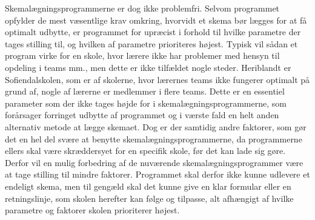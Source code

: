 Skemalægningsprogrammerne er dog ikke problemfri. Selvom programmet opfylder de mest væsentlige krav omkring, hvorvidt et skema bør lægges for at få optimalt udbytte, er programmet for upræcist i forhold til hvilke parametre der tages stilling til, og hvilken af parametre prioriteres højest. Typisk vil sådan et program virke for en skole, hvor lærere ikke har problemer med hensyn til opdeling i teams mm., men dette er ikke tilfældet nogle steder. Heriblandt er Sofiendalskolen, som er af skolerne, hvor lærernes teams ikke fungerer optimalt på grund af, nogle af lærerne er medlemmer i flere teams. Dette er en essentiel parameter som der ikke tages højde for i skemalægningsprogrammerne, som forårsager forringet udbytte af programmet og i værste fald en helt anden alternativ metode at lægge skemaet. Dog er der samtidig andre faktorer, som gør det en hel del svære at benytte skemalægningsprogrammerne, da programmerne ellers skal være skræddersyet for en specifik skole, før det kan lade sig gøre.
Derfor vil en mulig forbedring af de nuværende skemalægningsprogrammer være at tage stilling til mindre faktorer. Programmet skal derfor ikke kunne udlevere et endeligt skema, men til gengæld skal det kunne give en klar formular eller en retningslinje, som skolen herefter kan følge og tilpasse, alt afhængigt af hvilke parametre og faktorer skolen prioriterer højest\cite{tabulex}. 

